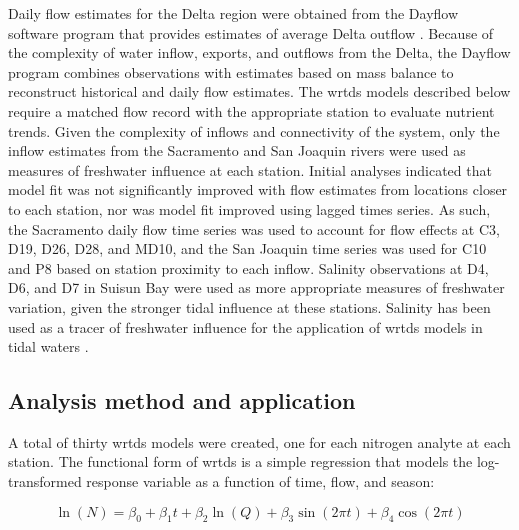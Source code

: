 \documentclass[journal = esthag, manuscript = article]{achemso}\usepackage[]{graphicx}\usepackage[]{color}
\begin{document}
Daily flow estimates for the Delta region were obtained from the Dayflow software program that provides estimates of average Delta outflow \cite{IEP16}.  Because of the complexity of water inflow, exports, and outflows from the Delta, the Dayflow program combines observations with estimates based on mass balance to reconstruct historical and daily flow estimates.  The \ac{wrtds} models described below require a matched flow record with the appropriate station to evaluate nutrient trends. Given the complexity of inflows and connectivity of the system, only the inflow estimates from the Sacramento and San Joaquin rivers were used as measures of freshwater influence at each station.  Initial analyses indicated that model fit was not significantly improved with flow estimates from locations closer to each station, nor was model fit improved using lagged times series.  As such, the Sacramento daily flow time series was used to account for flow effects at C3, D19, D26, D28, and MD10, and the San Joaquin time series was used for C10 and P8 based on station proximity to each inflow.  Salinity observations at D4, D6, and D7 in Suisun Bay were used as more appropriate measures of freshwater variation, given the stronger tidal influence at these stations.  Salinity has been used as a tracer of freshwater influence for the application of \ac{wrtds} models in tidal waters \cite{Beck15}.  

\subsection{Analysis method and application}

A total of thirty \ac{wrtds} models were created, one for each nitrogen analyte at each station.  The functional form of \ac{wrtds} is a simple regression\cite{Hirsch10} that models the log-transformed response variable as a function of time, flow, and season:

\begin{equation}
\ln\left(N\right) = \beta_0 + \beta_1 t + \beta_2 \ln\left(Q\right) + \beta_3 \sin\left(2\pi t\right) + \beta_4 \cos\left(2\pi t\right)
\end{equation}  
\end{document}
